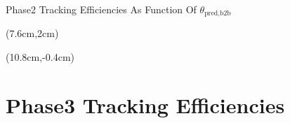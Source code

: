 \documentclass[8pt]{beamer}
\begin{document}
\begin{frame}{Phase2 Tracking Efficiencies As Function Of $\theta_{\textrm{pred,b2b}}$}
	
	
		
	\begin{textblock*}{5cm}(7.6cm,2cm)
	\end{textblock*}
	
	\begin{textblock*}{5cm}(10.8cm,-0.4cm)
	\end{textblock*}
	
	
	
	
	
	
	
	
	
	
	
	
	
\end{frame}

\section{Phase3 Tracking Efficiencies}
\end{document}
